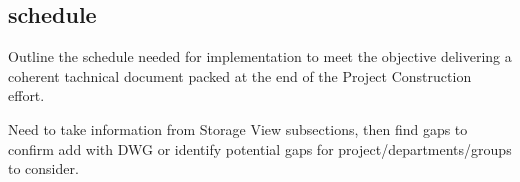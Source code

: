 \subsection{schedule}

Outline the schedule needed for implementation to meet the objective delivering a coherent tachnical document packed at the end of the Project Construction effort.

Need to take information from Storage View subsections, then find gaps to confirm add with DWG or identify potential gaps for project/departments/groups to consider.
